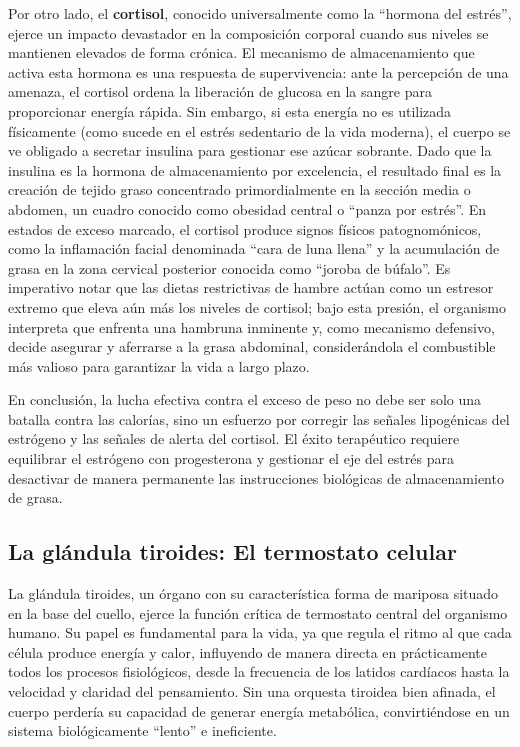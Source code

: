 \documentclass[
  spanish,
]{article}
\begin{document}
Por otro lado, el \textbf{cortisol}, conocido universalmente como la ``hormona del estrés'', ejerce un impacto devastador en la composición corporal cuando sus niveles se mantienen elevados de forma crónica. El mecanismo de almacenamiento que activa esta hormona es una respuesta de supervivencia: ante la percepción de una amenaza, el cortisol ordena la liberación de glucosa en la sangre para proporcionar energía rápida. Sin embargo, si esta energía no es utilizada físicamente (como sucede en el estrés sedentario de la vida moderna), el cuerpo se ve obligado a secretar insulina para gestionar ese azúcar sobrante. Dado que la insulina es la hormona de almacenamiento por excelencia, el resultado final es la creación de tejido graso concentrado primordialmente en la sección media o abdomen, un cuadro conocido como obesidad central o ``panza por estrés''.
En estados de exceso marcado, el cortisol produce signos físicos patognomónicos, como la inflamación facial denominada ``cara de luna llena'' y la acumulación de grasa en la zona cervical posterior conocida como ``joroba de búfalo''. Es imperativo notar que las dietas restrictivas de hambre actúan como un estresor extremo que eleva aún más los niveles de cortisol; bajo esta presión, el organismo interpreta que enfrenta una hambruna inminente y, como mecanismo defensivo, decide asegurar y aferrarse a la grasa abdominal, considerándola el combustible más valioso para garantizar la vida a largo plazo.

En conclusión, la lucha efectiva contra el exceso de peso no debe ser solo una batalla contra las calorías, sino un esfuerzo por corregir las señales lipogénicas del estrógeno y las señales de alerta del cortisol. El éxito terapéutico requiere equilibrar el estrógeno con progesterona y gestionar el eje del estrés para desactivar de manera permanente las instrucciones biológicas de almacenamiento de grasa.

\subsection{La glándula tiroides: El termostato celular}\label{la-gluxe1ndula-tiroides-el-termostato-celular}

La glándula tiroides, un órgano con su característica forma de mariposa situado en la base del cuello, ejerce la función crítica de termostato central del organismo humano. Su papel es fundamental para la vida, ya que regula el ritmo al que cada célula produce energía y calor, influyendo de manera directa en prácticamente todos los procesos fisiológicos, desde la frecuencia de los latidos cardíacos hasta la velocidad y claridad del pensamiento. Sin una orquesta tiroidea bien afinada, el cuerpo perdería su capacidad de generar energía metabólica, convirtiéndose en un sistema biológicamente ``lento'' e ineficiente.
\end{document}
